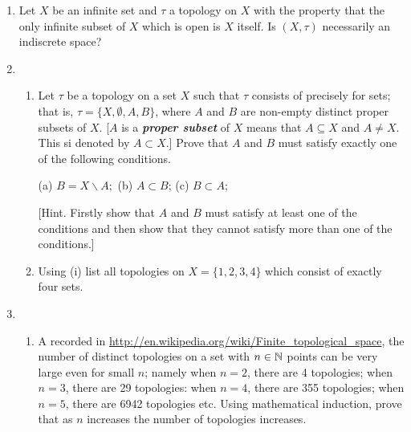 \documentclass[10pt,a4paper]{report}
\begin{document}
\begin{enumerate}
\begin{align*}
	S \subseteq X \text{ and } |S| = \infty\\
	| X\backslash S | < \infty \implies X\backslash S \text{ is open}\\
\end{align*}there are an infinite number of finite subsets whose compliment is infinite and closed.  These are precisely what make up a discrete topology.

\item Let $X$ be an infinite set and $\tau$ a topology on $X$ with the property that the only infinite subset of $X$ which is open is $X$ itself.  Is $(X,\tau)$ necessarily an indiscrete space?

\item \begin{enumerate}[label=(\roman*)]
	\item Let $\tau$ be a topology on a set $X$ such that $\tau$ consists of precisely for sets; that is, $\tau = \{X,\emptyset, A,B\}$, where $A$ and $B$ are non-empty distinct proper subsets of $X$.  [$A$ is a \textbf{\textit{proper subset}} of $X$ means that $A \subseteq X$ and $A \ne X$.  This si denoted by $A\subset X$.]  Prove that $A$ and $B$ must satisfy exactly one of the following conditions.
	\begin{center}
	(a) $B=X\backslash A;$    (b) $A \subset B$;    (c) $B\subset A$;	
	\end{center}
[Hint. Firstly show that $A$ and $B$ must satisfy at least one of the conditions and then show that they cannot satisfy more than one of the conditions.]

\item Using (i) list all topologies on $X =\{1,2,3,4\}$ which consist of exactly four sets.
	
\end{enumerate}

\item \begin{enumerate}[label=(\roman*)]
	\item A recorded in \url{http://en.wikipedia.org/wiki/Finite_topological_space}, the number of distinct topologies on a set with $n \in \mathbb{N}$ points can be very large even for small $n$; namely when $n =2$, there are 4 topologies;  when $n=3$, there are 29 topologies:  when $n=4$, there are 355 topologies;  when $n=5$, there are 6942 topologies etc.  Using mathematical induction, prove that as $n$ increases the number of topologies increases.\\
	

\end{enumerate}
\end{enumerate}
\end{document}
